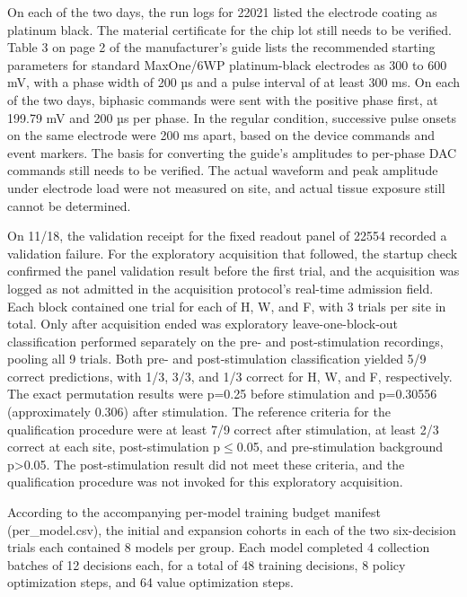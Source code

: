 \documentclass{article}
\begin{document}
On each of the two days, the run logs for 22021 listed the electrode coating as platinum black. The material certificate for the chip lot still needs to be verified. Table 3 on page 2 of the manufacturer’s guide lists the recommended starting parameters for standard MaxOne/6WP platinum-black electrodes as 300 to 600 mV, with a phase width of 200 µs and a pulse interval of at least 300 ms. On each of the two days, biphasic commands were sent with the positive phase first, at 199.79 mV and 200 µs per phase. In the regular condition, successive pulse onsets on the same electrode were 200 ms apart, based on the device commands and event markers. The basis for converting the guide’s amplitudes to per-phase DAC commands still needs to be verified. The actual waveform and peak amplitude under electrode load were not measured on site, and actual tissue exposure still cannot be determined.


On 11/18, the validation receipt for the fixed readout panel of 22554 recorded a validation failure. For the exploratory acquisition that followed, the startup check confirmed the panel validation result before the first trial, and the acquisition was logged as not admitted in the acquisition protocol's real-time admission field. Each block contained one trial for each of H, W, and F, with 3 trials per site in total. Only after acquisition ended was exploratory leave-one-block-out classification performed separately on the pre- and post-stimulation recordings, pooling all 9 trials. Both pre- and post-stimulation classification yielded 5/9 correct predictions, with 1/3, 3/3, and 1/3 correct for H, W, and F, respectively. The exact permutation results were p=0.25 before stimulation and p=0.30556 (approximately 0.306) after stimulation. The reference criteria for the qualification procedure were at least 7/9 correct after stimulation, at least 2/3 correct at each site, post-stimulation p\ensuremath{\leq}0.05, and pre-stimulation background p>0.05. The post-stimulation result did not meet these criteria, and the qualification procedure was not invoked for this exploratory acquisition.


According to the accompanying per-model training budget manifest (per\_\allowbreak{}model.csv), the initial and expansion cohorts in each of the two six-decision trials each contained 8 models per group. Each model completed 4 collection batches of 12 decisions each, for a total of 48 training decisions, 8 policy optimization steps, and 64 value optimization steps.
\end{document}
